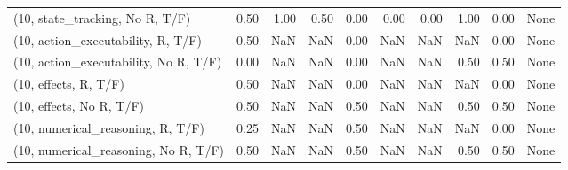\begin{table*}[h!]
\begin{adjustbox}{width=2\columnwidth,center}
\begin{tabular}{lrrr|rrr|rrr}
(10, state\_tracking, No R, T/F)       &                      0.50 &                  1.00 &                      0.50 &                          0.00 &                      0.00 &                          0.00 &                                   1.00 &                               0.00 &                                  None \\
(10, action\_executability, R, T/F)    &                      0.50 &                   NaN &                       NaN &                          0.00 &                       NaN &                           NaN &                                    NaN &                               0.00 &                                  None \\
(10, action\_executability, No R, T/F) &                      0.00 &                   NaN &                       NaN &                          0.00 &                       NaN &                           NaN &                                   0.50 &                               0.50 &                                  None \\
(10, effects, R, T/F)                 &                      0.50 &                   NaN &                       NaN &                          0.00 &                       NaN &                           NaN &                                    NaN &                               0.00 &                                  None \\
(10, effects, No R, T/F)              &                      0.50 &                   NaN &                       NaN &                          0.50 &                       NaN &                           NaN &                                   0.50 &                               0.50 &                                  None \\
(10, numerical\_reasoning, R, T/F)     &                      0.25 &                   NaN &                       NaN &                          0.50 &                       NaN &                           NaN &                                    NaN &                               0.00 &                                  None \\
(10, numerical\_reasoning, No R, T/F)  &                      0.50 &                   NaN &                       NaN &                          0.50 &                       NaN &                           NaN &                                   0.50 &                               0.50 &                                  None \\

\end{tabular}
\end{adjustbox}
\end{table*}
